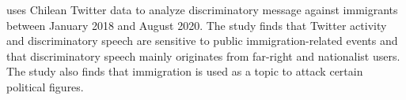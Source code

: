     \cite{glvez_2020_barmetro} uses Chilean Twitter data to analyze discriminatory message against immigrants between January 2018 and August 2020. The study finds that Twitter activity and discriminatory speech are sensitive to public immigration-related events and that discriminatory speech mainly originates from far-right and nationalist users. The study also finds that immigration is used as a topic to attack certain political figures.
    
    

        

